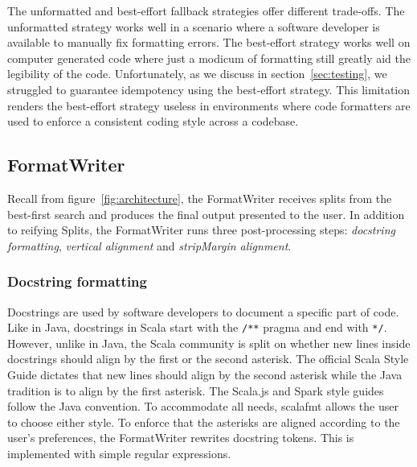 The unformatted and best-effort fallback strategies offer different trade-offs.
The unformatted strategy works well in a scenario where a software developer is available to manually fix formatting errors.
The best-effort strategy works well on computer generated code where just a modicum of formatting still greatly aid the legibility of the code.
Unfortunately, as we discuss in section~\ref{sec:testing}, we struggled to guarantee idempotency using the best-effort strategy.
This limitation renders the best-effort strategy useless in environments where code formatters are used to enforce a consistent coding style across a codebase.


\subsection{FormatWriter}
Recall from figure~\ref{fig:architecture}, the FormatWriter receives splits from the best-first search and produces the final output presented to the user.
In addition to reifying Splits, the FormatWriter runs three post-processing steps: \emph{docstring formatting}, \emph{vertical alignment} and \emph{stripMargin alignment}.

\subsubsection{Docstring formatting}\label{sec:docstring}
Docstrings are used by software developers to document a specific part of code.
Like in Java, docstrings in Scala start with the \texttt{/**} pragma and end with \texttt{*/}.
However, unlike in Java, the Scala community is split on whether new lines inside docstrings should align by the first or the second asterisk.
The official Scala Style Guide\autocite{Scala80:online} dictates that new lines should align by the second asterisk while the Java tradition is to align by the first asterisk.
The Scala.js\autocite{doeraene_scala.js_2015} and Spark\autocite{xin_spark_2015} style guides follow the Java convention.
To accommodate all needs, scalafmt allows the user to choose either style.
To enforce that the asterisks are aligned according to the user's preferences,
the FormatWriter rewrites docstring tokens.
This is implemented with simple regular expressions.

